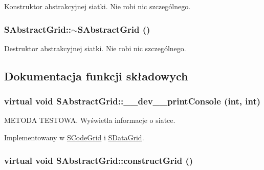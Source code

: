Konstruktor abstrakcyjnej siatki. Nie robi nic szczególnego. \hypertarget{classSAbstractGrid_7391180cba323fbd0d64d23157c8a6a6}{
\subsubsection[{$\sim$SAbstractGrid}]{\setlength{\rightskip}{0pt plus 5cm}SAbstractGrid::$\sim$SAbstractGrid ()}}
\label{classSAbstractGrid_7391180cba323fbd0d64d23157c8a6a6}


Destruktor abstrakcyjnej siatki. Nie robi nic szczególnego. 

\subsection{Dokumentacja funkcji składowych}
\hypertarget{classSAbstractGrid_e36c03b21a96f33d1ace5fd0b1d218f5}{
\subsubsection[{\_\-\_\-dev\_\-\_\-printConsole}]{\setlength{\rightskip}{0pt plus 5cm}virtual void SAbstractGrid::\_\-\_\-dev\_\-\_\-printConsole (int, \/  int)}}
\label{classSAbstractGrid_e36c03b21a96f33d1ace5fd0b1d218f5}


METODA TESTOWA. Wyświetla informacje o siatce. 

Implementowany w \hyperlink{classSCodeGrid_c01feeae87539b97aed07d67b975f174}{SCodeGrid} i \hyperlink{classSDataGrid_8b94af72ddf880b0297baf24ceb2395a}{SDataGrid}.\hypertarget{classSAbstractGrid_919248aad138ffb1c969e73c3e637dcd}{
\subsubsection[{constructGrid}]{\setlength{\rightskip}{0pt plus 5cm}virtual void SAbstractGrid::constructGrid ()}}
\label{classSAbstractGrid_919248aad138ffb1c969e73c3e637dcd}


